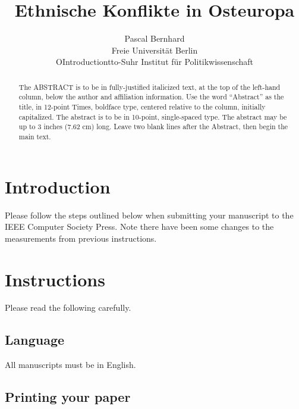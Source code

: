 \documentclass[
10pt,			%
paper=a4,		%
ngerman,		%
BCOR=0pt,		%
DIV=calc,		%
headinclude,	%
headsepline,	%
numbers=noenddot,
twocolumn,
]{article}
\begin{document}
\title{Ethnische Konflikte in Osteuropa}

\author{Pascal Bernhard\\
Freie Universität Berlin\\ OIntroductiontto-Suhr Institut für Politikwissenschaft}


\maketitle
\thispagestyle{empty}

\begin{abstract}
   The ABSTRACT is to be in fully-justified italicized text, at the top 
   of the left-hand column, below the author and affiliation 
   information. Use the word ``Abstract'' as the title, in 12-point 
   Times, boldface type, centered relative to the column, initially 
   capitalized. The abstract is to be in 10-point, single-spaced type. 
   The abstract may be up to 3 inches (7.62 cm) long. Leave two blank 
   lines after the Abstract, then begin the main text. 
\end{abstract}



\section{Introduction}

Please follow the steps outlined below when submitting your 
manuscript to the IEEE Computer Society Press. Note there have 
been some changes to the measurements from previous instructions. 

\section{Instructions}

Please read the following carefully.

\subsection{Language}

All manuscripts must be in English.

\subsection{Printing your paper}
\end{document}
